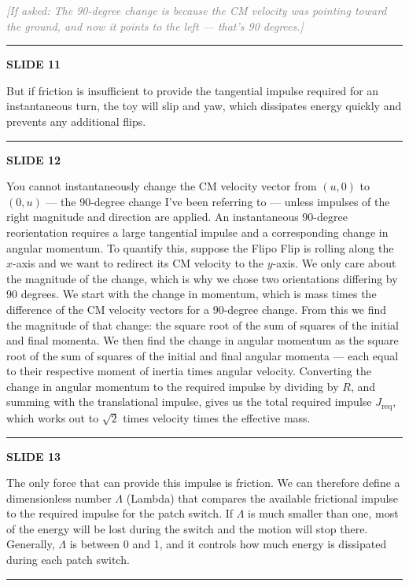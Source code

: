 \documentclass[a4paper,11pt]{article}
\newcommand{\slidetitle}[1]{{\small\textbf{SLIDE #1}}\par\smallskip}
\newcommand{\slidedivider}{\vspace{0.7em}\noindent\rule{\textwidth}{0.4pt}\vspace{0.7em}}
\begin{document}
\medskip
\noindent\textcolor{gray}{\small\itshape [If asked: The 90-degree change is because the CM velocity was pointing toward the ground, and now it points to the left --- that's 90 degrees.]}

\slidedivider

\slidetitle{11}
But if friction is insufficient to provide the tangential impulse required for an instantaneous turn, the toy will slip and yaw, which dissipates energy quickly and prevents any additional flips.

\slidedivider

\slidetitle{12}
You cannot instantaneously change the CM velocity vector from $(u,0)$ to $(0,u)$ --- the 90-degree change I've been referring to --- unless impulses of the right magnitude and direction are applied. An instantaneous 90-degree reorientation requires a large tangential impulse and a corresponding change in angular momentum. To quantify this, suppose the Flipo Flip is rolling along the $x$-axis and we want to redirect its CM velocity to the $y$-axis. We only care about the magnitude of the change, which is why we chose two orientations differing by 90 degrees. We start with the change in momentum, which is mass times the difference of the CM velocity vectors for a 90-degree change. From this we find the magnitude of that change: the square root of the sum of squares of the initial and final momenta. We then find the change in angular momentum as the square root of the sum of squares of the initial and final angular momenta --- each equal to their respective moment of inertia times angular velocity. Converting the change in angular momentum to the required impulse by dividing by $R$, and summing with the translational impulse, gives us the total required impulse $J_{\mathrm{req}}$, which works out to $\sqrt{2}$ times velocity times the effective mass.

\slidedivider

\slidetitle{13}
The only force that can provide this impulse is friction. We can therefore define a dimensionless number $\Lambda$ (Lambda) that compares the available frictional impulse to the required impulse for the patch switch. If $\Lambda$ is much smaller than one, most of the energy will be lost during the switch and the motion will stop there. Generally, $\Lambda$ is between 0 and 1, and it controls how much energy is dissipated during each patch switch.

\slidedivider
\end{document}

